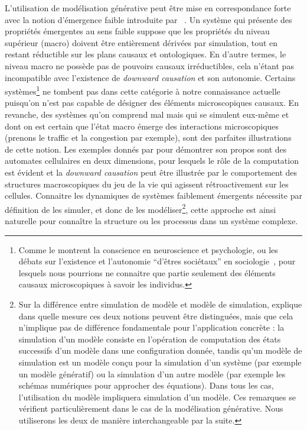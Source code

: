L'utilisation de modélisation générative peut être mise en correspondance forte avec la notion d'émergence faible introduite par~\cite{bedau2002downward} . Un système qui présente des propriétés émergentes au sens faible suppose que les propriétés du niveau supérieur (macro) doivent être entièrement dérivées par simulation, tout en restant réductible sur les plans causaux et ontologiques. En d'autre termes, le niveau macro ne possède pas de pouvoirs causaux irréductibles, cela n'étant pas incompatible avec l'existence de \emph{downward causation} et son autonomie. Certains systèmes\footnote{Comme le montrent la conscience en neuroscience et psychologie, ou les débats sur l'existence et l'autonomie ``d'êtres sociétaux'' en sociologie~\cite{angeletti2015etres}, pour lesquels nous pourrions ne connaitre que partie seulement des éléments causaux microscopiques à savoir les individus.} ne tombent pas dans cette catégorie à notre connaissance actuelle puisqu'on n'est pas capable de désigner des éléments microscopiques causaux. En revanche, des systèmes qu'on comprend mal mais qui se simulent eux-même et dont on est certain que l'état macro émerge des interactions microscopiques (prenons le traffic et la congestion par exemple), sont des parfaites illustrations de cette notion. Les exemples donnés par  pour démontrer son propos sont des automates cellulaires en deux dimensions, pour lesquels le rôle de la computation est évident et la \emph{downward causation} peut être illustrée par le comportement des structures macroscopiques du jeu de la vie qui agissent rétroactivement sur les cellules. Connaitre les dynamiques de systèmes faiblement émergents nécessite par définition de les simuler, et donc de les modéliser\footnote{Sur la différence entre simulation de modèle et modèle de simulation, \cite{phan2010agent} explique dans quelle mesure ces deux notions peuvent être distinguées, mais que cela n'implique pas de différence fondamentale pour l'application concrète : la simulation d'un modèle consiste en l'opération de computation des états successifs d'un modèle dans une configuration donnée, tandis qu'un modèle de simulation est un modèle conçu pour la simulation d'un système (par exemple un modèle génératif) ou la simulation d'un autre modèle (par exemple les schémas numériques pour approcher des équations). Dans tous les cas, l'utilisation du modèle impliquera simulation d'un modèle. Ces remarques se vérifient particulièrement dans le cas de la modélisation générative. Nous utiliserons les deux de manière interchangeable par la suite.}, cette approche est ainsi naturelle pour connaître la structure ou les processus dans un système complexe.



